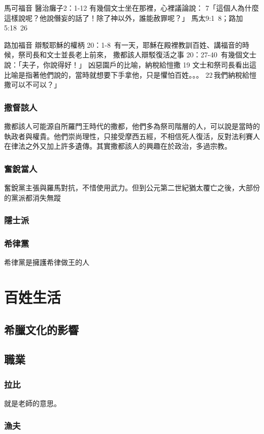 馬可福音  
醫治癱子2：1-12 有幾個文士坐在那裡，心裡議論說： 7「這個人為什麼這樣說呢？他說僭妄的話了！除了神以外，誰能赦罪呢？」
馬太9:1~8；路加5:18~26

路加福音
辯駁耶穌的權柄 20：1-8  有一天，耶穌在殿裡教訓百姓、講福音的時候，祭司長和文士並長老上前來，
撒都該人辯駁復活之事 20：27-40  有幾個文士說：「夫子，你說得好！」 
凶惡園戶的比喻，納稅給愷撒  19 文士和祭司長看出這比喻是指著他們說的，當時就想要下手拿他，只是懼怕百姓。。。 22 我們納稅給愷撒可以不可以？」

\subsubsection{撒督該人}
撒都該人可能源自所羅門王時代的撒都，他們多為祭司階層的人，可以說是當時的執政者與權貴。他們崇尚理性，只接受摩西五經，不相信死人復活，反對法利賽人在律法之外又加上許多遺傳。其實撒都該人的興趣在於政治，多過宗教。

\subsubsection{奮銳當人}
奮銳黨主張與羅馬對抗，不惜使用武力。但到公元第二世紀猶太覆亡之後，大部份的黨派都消失無蹤

\subsubsection{隱士派}
\subsubsection{希律黨}
希律黨是擁護希律做王的人

\section{百姓生活}

\subsection{希臘文化的影響}
\subsection{職業}


\subsubsection{拉比}
就是老師的意思。
\subsubsection{漁夫}
